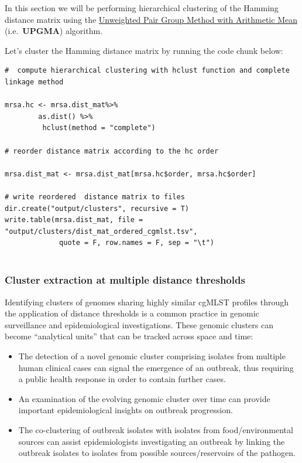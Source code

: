 \documentclass[
]{book}
\providecommand{\tightlist}{%
  \setlength{\itemsep}{0pt}\setlength{\parskip}{0pt}}
\begin{document}
In this section we will be performing hierarchical clustering of the Hamming distance matrix using the \href{https://en.wikipedia.org/wiki/UPGMA}{Unweighted Pair Group Method with Arithmetic Mean} (i.e.~\textbf{UPGMA}) algorithm.

Let's cluster the Hamming distance matrix by running the code chunk below:

\begin{verbatim}
#  compute hierarchical clustering with hclust function and complete linkage method

mrsa.hc <- mrsa.dist_mat%>%
        as.dist() %>%
         hclust(method = "complete")

# reorder distance matrix according to the hc order 

mrsa.dist_mat <- mrsa.dist_mat[mrsa.hc$order, mrsa.hc$order]

# write reordered  distance matrix to files 
dir.create("output/clusters", recursive = T)
write.table(mrsa.dist_mat, file = "output/clusters/dist_mat_ordered_cgmlst.tsv",
             quote = F, row.names = F, sep = "\t")
             
\end{verbatim}

\subsubsection{Cluster extraction at multiple distance thresholds}\label{cluster-extraction-at-multiple-distance-thresholds}

Identifying clusters of genomes sharing highly similar cgMLST profiles through the application of distance thresholds is a common practice in genomic surveillance and epidemiological investigations. These genomic clusters can become ``analytical units'' that can be tracked across space and time:

\begin{itemize}
\tightlist
\item
  The detection of a novel genomic cluster comprising isolates from multiple human clinical cases can signal the emergence of an outbreak, thus requiring a public health response in order to contain further cases.\\
\item
  An examination of the evolving genomic cluster over time can provide important epidemiological insights on outbreak progression.
\item
  The co-clustering of outbreak isolates with isolates from food/environmental sources can assist epidemiologists investigating an outbreak by linking the outbreak isolates to isolates from possible sources/reservoirs of the pathogen.
\end{itemize}
\end{document}
